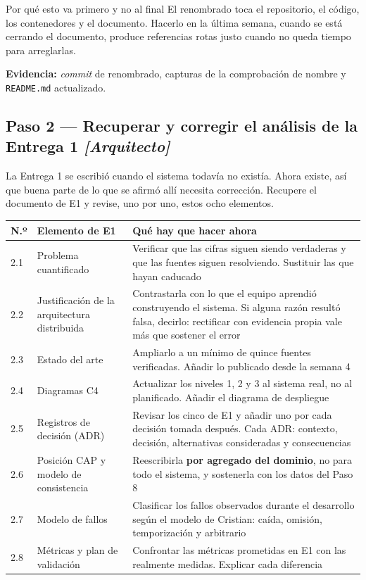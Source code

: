 \documentclass[11pt,a4paper]{article}
\newcommand{\paso}[1]{\subsection{#1}}
\begin{document}
	\begin{avisoBox}{Por qué esto va primero y no al final}
		El renombrado toca el repositorio, el código, los contenedores y el documento. Hacerlo en la última semana, cuando se está cerrando el documento, produce referencias rotas justo cuando no queda tiempo para arreglarlas.
	\end{avisoBox}
	
	\textbf{Evidencia:} \emph{commit} de renombrado, capturas de la comprobación de nombre y \texttt{README.md} actualizado.
	
	\paso{Paso 2 --- Recuperar y corregir el análisis de la Entrega 1 \emph{[Arquitecto]}}
	
	La Entrega 1 se escribió cuando el sistema todavía no existía. Ahora existe, así que buena parte de lo que se afirmó allí necesita corrección. Recupere el documento de E1 y revise, uno por uno, estos ocho elementos.
	
	\begin{center}
		\footnotesize
		\begin{longtable}{@{}p{0.7cm}p{4.6cm}p{9.9cm}@{}}
			\toprule
			\textbf{N.º} & \textbf{Elemento de E1} & \textbf{Qué hay que hacer ahora} \\
			\midrule
			\endhead
			2.1 & Problema cuantificado & Verificar que las cifras siguen siendo verdaderas y que las fuentes siguen resolviendo. Sustituir las que hayan caducado \\
			2.2 & Justificación de la arquitectura distribuida & Contrastarla con lo que el equipo aprendió construyendo el sistema. Si alguna razón resultó falsa, decirlo: rectificar con evidencia propia vale más que sostener el error \\
			2.3 & Estado del arte & Ampliarlo a un mínimo de quince fuentes verificadas. Añadir lo publicado desde la semana 4 \\
			2.4 & Diagramas C4 & Actualizar los niveles 1, 2 y 3 al sistema real, no al planificado. Añadir el diagrama de despliegue \\
			2.5 & Registros de decisión (ADR) & Revisar los cinco de E1 y añadir uno por cada decisión tomada después. Cada ADR: contexto, decisión, alternativas consideradas y consecuencias \\
			2.6 & Posición CAP y modelo de consistencia & Reescribirla \textbf{por agregado del dominio}, no para todo el sistema, y sostenerla con los datos del Paso 8 \\
			2.7 & Modelo de fallos & Clasificar los fallos observados durante el desarrollo según el modelo de Cristian: caída, omisión, temporización y arbitrario \\
			2.8 & Métricas y plan de validación & Confrontar las métricas prometidas en E1 con las realmente medidas. Explicar cada diferencia \\
			\bottomrule
		\end{longtable}
	\end{center}
	
\end{document}
